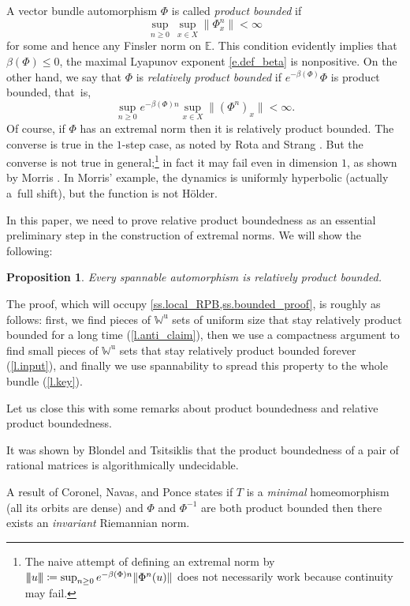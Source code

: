 \documentclass[10pt]{amsart}
\def\vcentcolon{\mathrel{\mathop\ordinarycolon}}
\providecommand\ordinarycolon{:}
\providecommand*\coloneqq{\vcentcolon\mathrel{\mkern-1.2mu}=}
\theoremstyle{plain}
\newtheorem{proposition}[theorem]{Proposition}
\theoremstyle{definition}
\newcommand{\tribar}[1]{\mathopen{| {\kern -1.5pt} | {\kern -1.5pt} |} {#1}
\mathclose{| {\kern -1.5pt} | {\kern -1.5pt} |}}
\newcommand{\EE}{\mathbb{E}}
\newcommand{\WW}{\mathbb{W}}
\newcommand{\uu}{\mathrm{u}}
\begin{document}
A vector bundle automorphism $\Phi$ is called \emph{product bounded} if
\[
\sup_{n \ge 0} \, \sup_{x\in X} \|\Phi^n_x\| < \infty
\]
for some and hence any Finsler norm on $\EE$.
This condition evidently implies that $\beta(\Phi)\le 0$, \ie the maximal Lyapunov exponent \eqref{e.def_beta} is nonpositive.
On the other hand, we say that $\Phi$ is \emph{relatively product bounded} if $e^{-\beta(\Phi)} \Phi$ is product bounded, that~is,
\[
\sup_{n \ge 0} e^{-\beta(\Phi) n} \sup_{x\in X} \|(\Phi^n)_x\| < \infty.
\]
Of course, if $\Phi$ has an extremal norm then it is relatively product bounded.
The converse is true in the $1$-step case, as noted by Rota and Strang \cite{RS}.
But the converse is not true in general;\footnote{The naive attempt of defining an extremal norm by $\tribar{u} \coloneqq \sup_{n\ge 0} e^{-\beta(\Phi) n}\|\Phi^n(u)\|$ does not necessarily work because continuity may fail.} in fact it may fail even in dimension $1$, as shown by Morris \cite[Prop.\,2]{Morris_sufficient}.
In Morris' example, the dynamics is uniformly hyperbolic (actually a~full shift), but the function is not Hölder.

In this paper, we need to prove relative product boundedness as an essential preliminary step in the construction of extremal norms.
We will show the following:

\begin{proposition}\label{p.bounded}
Every spannable automorphism is relatively product bounded.
\end{proposition}

The proof, which will occupy \cref{ss.local_RPB,ss.bounded_proof},
is roughly as follows:
first, we find pieces of $\WW^\uu$ sets of uniform size that stay relatively product bounded for a long time (\cref{l.anti_claim}), then we use a compactness argument to find small pieces of $\WW^\uu$ sets that stay relatively product bounded forever (\cref{l.input}), and finally we use spannability to spread this property to the whole bundle (\cref{l.key}).

Let us close this  with some remarks about product boundedness and relative product boundedness.

It was shown by Blondel and Tsitsiklis \cite{BT} that the product boundedness of a pair of rational matrices is algorithmically undecidable.

A result of Coronel, Navas, and Ponce \cite{CNP} states if $T$ is a \emph{minimal} homeomorphism (\ie all its orbits are dense) and $\Phi$ and $\Phi^{-1}$ are both product bounded then there exists an \emph{invariant} Riemannian norm.
\end{document}
